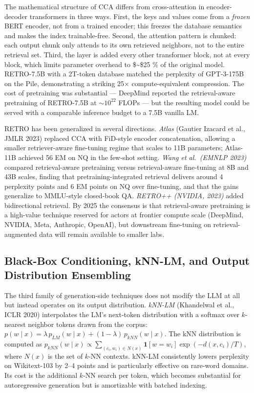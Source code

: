 The mathematical structure of CCA differs from cross-attention in encoder-decoder transformers in three ways. First, the keys and values come from a \emph{frozen} BERT encoder, not from a trained encoder; this freezes the database semantics and makes the index trainable-free. Second, the attention pattern is chunked: each output chunk only attends to its own retrieved neighbors, not to the entire retrieval set. Third, the layer is added every other transformer block, not at every block, which limits parameter overhead to \$\sim\$25 \% of the original model. RETRO-7.5B with a 2T-token database matched the perplexity of GPT-3-175B on the Pile, demonstrating a striking 25× compute-equivalent compression. The cost of pretraining was substantial --- DeepMind reported the retrieval-aware pretraining of RETRO-7.5B at \(\sim 10^{22}\) FLOPs --- but the resulting model could be served with a comparable inference budget to a 7.5B vanilla LM.

RETRO has been generalized in several directions. \emph{Atlas} (Gautier Izacard et al., JMLR 2023) replaced CCA with FiD-style encoder concatenation, allowing a smaller retriever-aware fine-tuning regime that scales to 11B parameters; Atlas-11B achieved 56 EM on NQ in the few-shot setting. \emph{Wang et al.~(EMNLP 2023)} compared retrieval-aware pretraining versus retrieval-aware fine-tuning at 8B and 43B scales, finding that pretraining-integrated retrieval delivers around 4 perplexity points and 6 EM points on NQ over fine-tuning, and that the gains generalize to MMLU-style closed-book QA. \emph{RETRO++ (NVIDIA, 2023)} added bidirectional retrieval. By 2025 the consensus is that retrieval-aware pretraining is a high-value technique reserved for actors at frontier compute scale (DeepMind, NVIDIA, Meta, Anthropic, OpenAI), but downstream fine-tuning on retrieval-augmented data will remain available to smaller labs.

\subsection{Black-Box Conditioning, kNN-LM, and Output Distribution Ensembling}\label{black-box-conditioning-knn-lm-and-output-distribution-ensembling}

The third family of generation-side techniques does not modify the LLM at all but instead operates on its output distribution. \emph{kNN-LM} (Khandelwal et al., ICLR 2020) interpolates the LM's next-token distribution with a softmax over \(k\)-nearest neighbor tokens drawn from the corpus: \(p(w \mid x) = \lambda \, p_{LM}(w \mid x) + (1 - \lambda) \, p_{kNN}(w \mid x)\). The kNN distribution is computed as \(p_{kNN}(w \mid x) \propto \sum_{(c_i, w_i) \in N(x)} \mathbf{1}[w = w_i] \exp(-d(x, c_i) / T)\), where \(N(x)\) is the set of \(k\)-NN contexts. kNN-LM consistently lowers perplexity on Wikitext-103 by 2--4 points and is particularly effective on rare-word domains. Its cost is the additional \(k\)-NN search per token, which becomes substantial for autoregressive generation but is amortizable with batched indexing.

